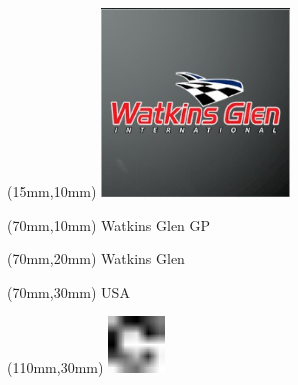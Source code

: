 \null\newpage
\begin{textblock*}{50mm}(15mm,10mm)%
\includegraphics[width=50mm]{LG/2015-05-20_00097.png}
\end{textblock*}
\begin{textblock*}{130mm}(70mm,10mm)%
{\fontsize{20}{20}\selectfont Watkins Glen GP}\\
\end{textblock*}
\begin{textblock*}{120mm}(70mm,20mm)%
{\fontsize{16}{16}\selectfont Watkins Glen}\\
\end{textblock*}
\begin{textblock*}{120mm}(70mm,30mm)%
{\fontsize{12}{12}\selectfont USA}
\end{textblock*}
\begin{textblock*}{30mm}(110mm,30mm)%
\centering
\includegraphics[height=15mm]{icons/fa-rotate-right.pdf}
\end{textblock*}
